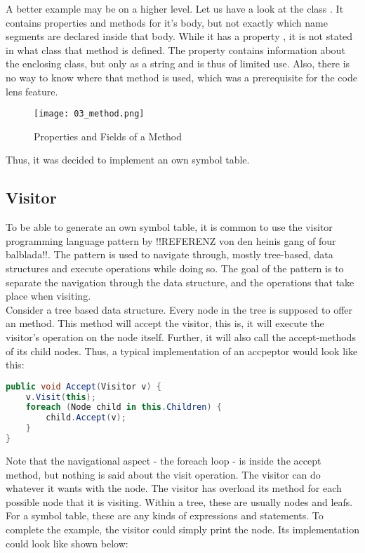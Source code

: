 A better example may be on a higher level. Let us have a look at the class . It contains properties and methods for it's body, but not exactly which name segments are declared inside that body. While it has a property , it is not stated in what class that method is defined. The property  contains information about the enclosing class, but only as a string and is thus of limited use. Also, there is no way to know where that method is used, which was a prerequisite for the code lens feature.

\begin{figure}[H]
    \centering
    \texttt{[image: 03\_method.png]}
    \caption{Properties and Fields of a Method}
    \label{fig:method}
\end{figure}

Thus, it was decided to implement an own symbol table.

\subsection{Visitor}
To be able to generate an own symbol table, it is common to use the visitor programming language pattern by !!REFERENZ von den heinis gang of four balblada!!. The pattern is used to navigate through, mostly tree-based, data structures and execute operations while doing so. The goal of the pattern is to separate the navigation through the data structure, and the operations that take place when visiting.\\

Consider a tree based data structure. Every node in the tree is supposed to offer an  method. This method will accept the visitor, this is, it will execute the visitor's operation on the node itself. Further, it will also call the accept-methods of its child nodes. Thus, a typical implementation of an accpeptor would look like this:

\begin{lstlisting}[language=csharp, caption={Example for Accept}, captionpos=b, label={lst:accept}]
public void Accept(Visitor v) {
    v.Visit(this);
    foreach (Node child in this.Children) {
        child.Accept(v);
    }
}
\end{lstlisting}

Note that the navigational aspect - the foreach loop - is inside the accept method, but nothing is said about the visit operation. The visitor can do whatever it wants with the node. The visitor has overload its  method for each possible node that it is visiting. Within a tree, these are usually nodes and leafs. For a symbol table, these are any kinds of expressions and statements. To complete the example, the visitor could simply print the node. Its implementation could look like shown below:


